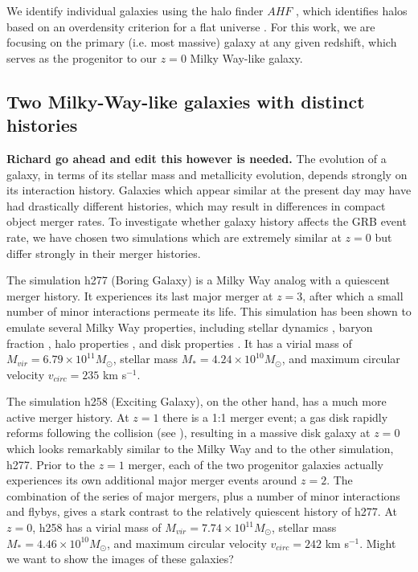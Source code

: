 \documentclass[nofootinbib,twocolumn,prd]{emulateapj}
\newcommand\editremark[1]{{\color{red}#1}}
\newcommand\msun{M_\odot}
\begin{document}

We identify individual galaxies using the halo finder $AHF$
\citep{2004MNRAS.351..399G,2009ApJS..182..608K}, which identifies halos based on an
overdensity criterion for a flat universe \citep{1997PhDT........14G}.  For this
work, we are focusing on the primary (i.e. most massive) galaxy at any
given redshift, which serves as the progenitor to our $z = 0$ Milky
Way-like galaxy.



\subsection{Two Milky-Way-like galaxies with distinct histories }

{\bf Richard go ahead and edit this however is needed.}  The evolution
of a galaxy, in terms of its stellar mass and metallicity evolution,
depends strongly on its interaction history.  Galaxies which appear
similar at the present day may have had drastically different
histories, which may result in differences in compact object merger
rates.  To investigate whether galaxy history affects the GRB event
rate, we have chosen two simulations which are extremely similar at $z
= 0$ but differ strongly in their merger histories.

The simulation h277 (Boring Galaxy) is a Milky Way analog with a
quiescent merger history.  It experiences its last major merger at $z
= 3$, after which a small number of minor interactions permeate its
life.  This simulation has been shown to emulate several Milky Way
properties, including stellar dynamics
\citep{2012ApJ...758L..23L,2014ApJ...794..151L,2014ApJ...790...89K}, baryon fraction
\citep{2013ApJ...766...56M}, halo properties \citep{2009ApJ...702.1058Z,2010ApJ...721..738Z}, and
disk properties \citep{2011ApJ...728...51B}.  It has a virial mass of $M_{vir} =
6.79 \times 10^{11} \msun$, stellar mass $M_* = 4.24 \times 10^{10}
\msun$, and maximum circular velocity $v_{circ} = 235$ km s$^{-1}$.

  The simulation h258 (Exciting Galaxy), on the other hand, has a much
  more active merger history.  At $z = 1$ there is a 1:1 merger event;
  a gas disk rapidly reforms following the collision (see
  \citet{2009MNRAS.398..312G}), resulting in a massive disk galaxy at $z = 0$
  which looks remarkably similar to the Milky Way and to the other
  simulation, h277.  Prior to the $z = 1$ merger, each of the two
  progenitor galaxies actually experiences its own additional major
  merger events around $z = 2$.  The combination of
  the series of major mergers, plus a number of minor interactions and
  flybys, gives a stark contrast to the relatively quiescent history
  of h277.  At $z = 0$, h258 has a virial mass of $M_{vir} = 7.74
  \times 10^{11} \msun$, stellar mass $M_* = 4.46 \times 10^{10}
  \msun$, and maximum circular velocity $v_{circ} = 242$ km s$^{-1}$.  \editremark{Might we want to show the images of these galaxies?}
\end{document}
